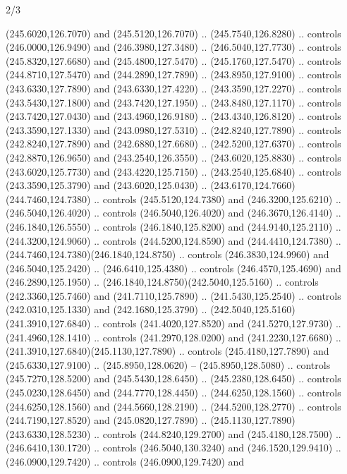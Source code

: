 \begin{flagdescription}{2/3}
\begin{scope}[xshift=0.5\flaglength,yshift=0.5\flagwidth,scale=\flagwidth/259.2]
\begin{scope}[y=0.8pt, x=0.8pt, yscale=-1,shift={(-243,-162)}]
      (245.6020,126.7070) and (245.5120,126.7070) .. (245.7540,126.8280) .. controls
      (246.0000,126.9490) and (246.3980,127.3480) .. (246.5040,127.7730) .. controls
      (245.8320,127.6680) and (245.4800,127.5470) .. (245.1760,127.5470) .. controls
      (244.8710,127.5470) and (244.2890,127.7890) .. (243.8950,127.9100) .. controls
      (243.6330,127.7890) and (243.6330,127.4220) .. (243.3590,127.2270) .. controls
      (243.5430,127.1800) and (243.7420,127.1950) .. (243.8480,127.1170) .. controls
      (243.7420,127.0430) and (243.4960,126.9180) .. (243.4340,126.8120) .. controls
      (243.3590,127.1330) and (243.0980,127.5310) .. (242.8240,127.7890) .. controls
      (242.8240,127.7890) and (242.6880,127.6680) .. (242.5200,127.6370) .. controls
      (242.8870,126.9650) and (243.2540,126.3550) .. (243.6020,125.8830) .. controls
      (243.6020,125.7730) and (243.4220,125.7150) .. (243.2540,125.6840) .. controls
      (243.3590,125.3790) and (243.6020,125.0430) ..
      (243.6170,124.7660)(244.7460,124.7380) .. controls (245.5120,124.7380) and
      (246.3200,125.6210) .. (246.5040,126.4020) .. controls (246.5040,126.4020) and
      (246.3670,126.4140) .. (246.1840,126.5550) .. controls (246.1840,125.8200) and
      (244.9140,125.2110) .. (244.3200,124.9060) .. controls (244.5200,124.8590) and
      (244.4410,124.7380) .. (244.7460,124.7380)(246.1840,124.8750) .. controls
      (246.3830,124.9960) and (246.5040,125.2420) .. (246.6410,125.4380) .. controls
      (246.4570,125.4690) and (246.2890,125.1950) ..
      (246.1840,124.8750)(242.5040,125.5160) .. controls (242.3360,125.7460) and
      (241.7110,125.7890) .. (241.5430,125.2540) .. controls (242.0310,125.1330) and
      (242.1680,125.3790) .. (242.5040,125.5160)(241.3910,127.6840) .. controls
      (241.4020,127.8520) and (241.5270,127.9730) .. (241.4960,128.1410) .. controls
      (241.2970,128.0200) and (241.2230,127.6680) ..
      (241.3910,127.6840)(245.1130,127.7890) .. controls (245.4180,127.7890) and
      (245.6330,127.9100) .. (245.8950,128.0620) -- (245.8950,128.5080) .. controls
      (245.7270,128.5200) and (245.5430,128.6450) .. (245.2380,128.6450) .. controls
      (245.0230,128.6450) and (244.7770,128.4450) .. (244.6250,128.1560) .. controls
      (244.6250,128.1560) and (244.5660,128.2190) .. (244.5200,128.2770) .. controls
      (244.7190,127.8520) and (245.0820,127.7890) ..
      (245.1130,127.7890)(243.6330,128.5230) .. controls (244.8240,129.2700) and
      (245.4180,128.7500) .. (246.6410,130.1720) .. controls (246.5040,130.3240) and
      (246.1520,129.9410) .. (246.0900,129.7420) .. controls (246.0900,129.7420) and

\end{scope}
\end{scope}
\end{flagdescription}
